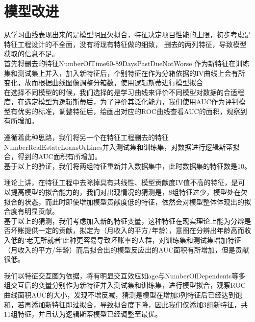 \documentclass[12pt]{article}
\begin{document}
\section{模型改进}
\begin{flushleft}
	\noindent\qquad 从学习曲线表现出来的是模型明显欠拟合，特征决定项目性能的上限，初步考虑是特征工程设计的不全面，没有将现有特征做的细致， 删去的两列特征，导致模型获取的信息不足。\\
	\noindent\qquad 首先将删去的特征NumberOfTime60-89DaysPastDueNotWorse 作为新特征在训练集和测试集上并入，加入新特征后，个别特征在作为分箱依据的IV曲线上会有所变化，故而根据曲线图像调整分箱数，\noindent\qquad 使用逻辑斯蒂进行模型拟合\\
	在选择不同模型的时候，我们选择的是学习曲线来评价不同模型对数据的合适程度，在选定模型为逻辑斯蒂后，为了评价其泛化能力，我们使用AUC作为评判模型有优劣的标准，调整特征后，绘画出对应的ROC曲线查看AUC的面积，观察到有所增加。\\

\end{flushleft}
\begin{flushleft}
		\noindent\qquad 遵循着此种思路，我们将另一个在特征工程删去的特征NumberRealEstateLoansOrLines并入测试集和训练集，对数据进行逻辑斯蒂拟合，得到的AUC面积有所增加。\\
	\noindent\qquad  基于以上的验证，我们将两组特征重新并入数据集中，此时数据集的特征数是10。\\
	
	\end{flushleft}

\begin{flushleft}
	\noindent\qquad 理论上讲，在特征工程中去除掉具有共线性、模型贡献度IV值不高的特征，是可以提高模型的拟合能力的，我们对出现情况的猜测是，8组特征过少，模型处在欠拟合的状态，而此时即使增加模型贡献度低的特征，依然会对模型整体体现出的拟合度有明显贡献。\\
	\noindent\qquad 基于以上的猜测，我们考虑加入新的特征变量，这种特征在现实理论上能为分辨是否坏账提供一定的贡献，拟定为（月收入的平方/年龄），意图在分辨出年龄高而收入低的‘老无所就者’此种更容易导致坏账率的人群，对训练集和测试集增加特征（月收入的平方/年龄）而后拟合出的模型反应出的AUC面积有所增加，但是贡献很低。
	
	
\end{flushleft}
\begin{flushleft}
	\noindent\qquad 我们以特征交互图为依据，将有明显交互效应如age与NumberOfDependents等多组交互后的变量分别作为新特征并入测试集和训练集，进行模型拟合，观察ROC曲线面积AUC的大小，发现不增反减，猜测是模型在增加3列特征后已经达到饱和，若再添加新特征即过拟合，导致拟合度下降，因此我们仅添加3组新特征，共11组特征，并且认为逻辑斯蒂模型已经调整至最优。
\end{flushleft}
\newpage
\end{document}
